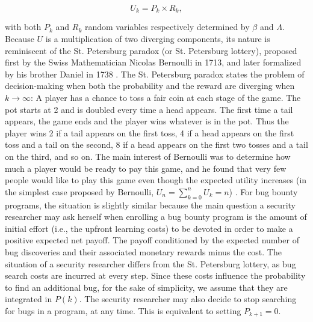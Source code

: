 \begin{equation}
\label{ }
U_k = P_k \times R_k,
\end{equation}

\noindent with both $P_k$ and $R_k$ random variables respectively determined by $\beta$ and $\Lambda$. Because $U$ is a multiplication of two diverging components, its nature is reminiscent of the St. Petersburg paradox (or St. Petersburg lottery), proposed first by the Swiss Mathematician Nicolas Bernoulli in 1713, and later formalized by his brother Daniel in 1738 \cite{bernoulli1954exposition}.  The St. Petersburg paradox states the problem of decision-making when both the probability and the reward are diverging when $k \rightarrow \infty$: A player has a chance to toss a fair coin at each stage of the game. The pot starts at 2 and is doubled every time a head appears. The first time a tail appears, the game ends and the player wins whatever is in the pot. Thus the player wins 2 if a tail appears on the first toss, 4 if a head appears on the first toss and a tail on the second, 8 if a head appears on the first two tosses and a tail on the third, and so on. The main interest of Bernoulli was to determine how much a player would be ready to pay this game, and he found that very few people would like to play this game even though the expected utility increases  (in the simplest case proposed by Bernoulli, $U_n = \sum_{k=0}^{n} U_k = n$) \cite{bernoulli1954exposition}. For bug bounty programs, the situation is slightly similar because the main question a security researcher may ask herself when enrolling a bug bounty program is the amount of initial effort (i.e., the upfront learning costs) to be devoted in order to make a positive expected net payoff. The payoff conditioned by the expected number of bug discoveries and their associated monetary rewards minus the cost. The situation of a security researcher differs from the St. Petersburg lottery, as bug search costs are incurred at every step. Since these costs influence the probability to find an additional bug, for the sake of simplicity, we assume that they are integrated in $P(k)$. The security researcher may also decide to stop searching for bugs in a program, at any time. This is equivalent to setting $P_{k+1} = 0$.\\


